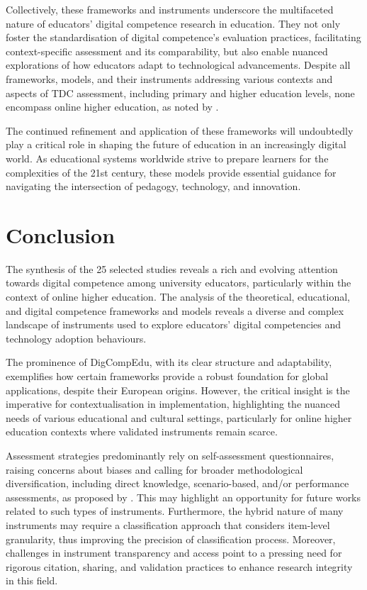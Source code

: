\documentclass[english]{textolivre}
\begin{document}
Collectively, these frameworks and instruments underscore the multifaceted nature of educators’ digital competence research in education. They not only foster the standardisation of digital competence’s evaluation practices, facilitating context-specific assessment and its comparability, but also enable nuanced explorations of how educators adapt to technological advancements. Despite all frameworks, models, and their instruments addressing various contexts and aspects of TDC assessment, including primary and higher education levels, none encompass online higher education, as noted by \textcite{moreira2023digital,santos2024applicability}.

The continued refinement and application of these frameworks will undoubtedly play a critical role in shaping the future of education in an increasingly digital world. As educational systems worldwide strive to prepare learners for the complexities of the 21st century, these models provide essential guidance for navigating the intersection of pedagogy, technology, and innovation.

\section{Conclusion}\label{sec-format-simple}
The synthesis of the 25 selected studies reveals a rich and evolving attention towards digital competence among university educators, particularly within the context of online higher education. The analysis of the theoretical, educational, and digital competence frameworks and models reveals a diverse and complex landscape of instruments used to explore educators’ digital competencies and technology adoption behaviours.

The prominence of DigCompEdu, with its clear structure and adaptability, exemplifies how certain frameworks provide a robust foundation for global applications, despite their European origins. However, the critical insight is the imperative for contextualisation in implementation, highlighting the nuanced needs of various educational and cultural settings, particularly for online higher education contexts where validated instruments remain scarce.

Assessment strategies predominantly rely on self-assessment questionnaires, raising concerns about biases and calling for broader methodological diversification, including direct knowledge, scenario-based, and/or performance assessments, as proposed by \textcite{mattar2022digcomp}. This may highlight an opportunity for future works related to such types of instruments. Furthermore, the hybrid nature of many instruments may require a classification approach that considers item-level granularity, thus improving the precision of classification process. Moreover, challenges in instrument transparency and access point to a pressing need for rigorous citation, sharing, and validation practices to enhance research integrity in this field.
\end{document}
